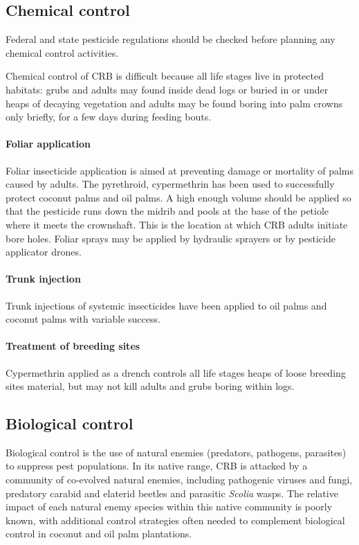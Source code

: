 \documentclass[twocolumn,letterpaper]{scrartcl}
\begin{document}
\subsection{Chemical control}
Federal and state pesticide regulations should be checked before planning any chemical control activities.

Chemical control of CRB is difficult because all life stages live in protected habitats: grubs and adults may found inside dead logs or buried in or under heaps of decaying vegetation and adults may be found boring into palm crowns only briefly, for a few days during feeding bouts. 

\paragraph{Foliar application}
Foliar insecticide application is aimed at preventing damage or mortality of palms caused by adults. The pyrethroid, cypermethrin has been used to successfully protect coconut palms and oil palms. A high enough volume should be applied so that the pesticide runs down the midrib and pools at the base of the petiole where it meets the crownshaft. This is the location at which CRB adults initiate bore holes. Foliar sprays may be applied by hydraulic sprayers or by pesticide applicator drones.  

\paragraph{Trunk injection}
Trunk injections of systemic insecticides have been applied to oil palms and coconut palms with variable success.

\paragraph{Treatment of breeding sites}
Cypermethrin applied as a drench controls all life stages heaps of loose breeding sites material, but may not kill adults and grubs boring within logs.

\subsection{Biological control}

Biological control is the use of natural enemies (predators, pathogens, parasites) to suppress pest populations. In its native range, CRB is attacked by a community of co-evolved natural enemies, including pathogenic viruses and fungi, predatory carabid and elaterid beetles  and  parasitic  \textit{Scolia}  wasps.  The  relative  impact  of  each  natural  enemy  species  within  this  native community is poorly known, with additional control strategies often needed to complement biological control in coconut and oil palm plantations.
\end{document}
